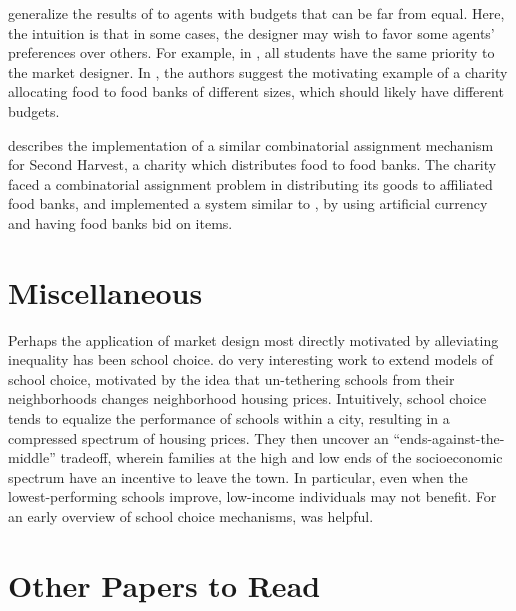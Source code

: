 \documentclass[JEL]{AEA}
\begin{document}
\cite{babaioff-2019} generalize the results of \cite{budish-2011} to agents with budgets that can be far from equal. Here, the intuition is that in some cases, the designer may wish to favor some agents' preferences over others. For example, in \cite{budish-2011}, all students have the same priority to the market designer. In \cite{babaioff-2019}, the authors suggest the motivating example of a charity allocating food to food banks of different sizes, which should likely have different budgets.

\cite{prendergast-2017} describes the implementation of a similar combinatorial assignment mechanism for Second Harvest, a charity which distributes food to food banks. The charity faced a combinatorial assignment problem in distributing its goods to affiliated food banks, and implemented a system similar to \cite{budish-2011}, by using artificial currency and having food banks bid on items.

\section{Miscellaneous}

Perhaps the application of market design most directly motivated by alleviating inequality has been school choice. \cite{avery-2020} do very interesting work to extend models of school choice, motivated by the idea that un-tethering schools from their neighborhoods changes neighborhood housing prices. Intuitively, school choice tends to equalize the performance of schools within a city, resulting in a compressed spectrum of housing prices. They then uncover an ``ends-against-the-middle'' tradeoff, wherein families at the high and low ends of the socioeconomic spectrum have an incentive to leave the town. In particular, even when the lowest-performing schools improve, low-income individuals may not benefit. For an early overview of school choice mechanisms, \cite{pathak-2011} was helpful.

\section{Other Papers to Read}
\end{document}
